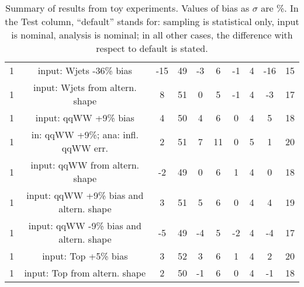 \begin{table}
\begin{center}
\begin{tabular}{c | c  | c c | c c | c c | c c}
1 & input: Wjets -36\% bias             &-15 & 49 &-3 & 6  &-1 & 4 &-16 & 15 \\
1 & input: Wjets from altern. shape     & 8  & 51 & 0 & 5  &-1 & 4 &-3  & 17 \\
\hline
1 & input: qqWW +9\% bias               & 4  & 50 & 4 & 6  & 0 & 4 & 5  & 18 \\
1 & in: qqWW +9\%; ana: infl. qqWW err. & 2  & 51 & 7 & 11 & 0 & 5 & 1  & 20 \\
1 & input: qqWW from altern. shape      &-2  & 49 & 0 & 6  & 1 & 4 & 0  & 18 \\
1 & input: qqWW +9\% bias and altern. shape & 3  & 51 & 5 & 6 & 0 & 4 & 4  & 19 \\
1 & input: qqWW -9\% bias and altern. shape &-5  & 49 &-4 & 5 &-2 & 4 &-4  & 17 \\
\hline
1 & input: Top +5\% bias                & 3  & 52 & 3 & 6  & 1 & 4 & 2  & 20 \\
1 & input: Top from altern. shape       & 2  & 50 &-1 & 6  & 0 & 4 &-1  & 18 \\
\hline
\hline
\end{tabular}
\caption{Summary of results from toy experiments. Values of bias as $\sigma$ are \%.
In the Test column, ``default'' stands for: sampling is statistical only, input is nominal, analysis is nominal; 
in all other cases, the difference with respect to default is stated.}
\label{tab:toy_summary_hcp}
\end{center}
\end{table}




